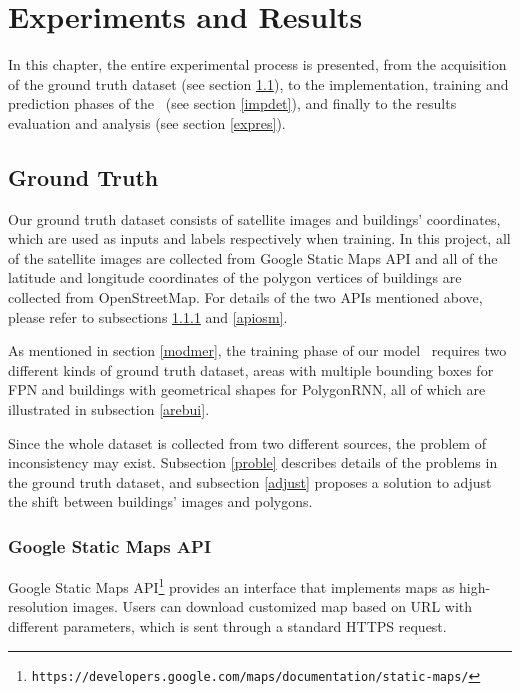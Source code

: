 \chapter{Experiments and Results}\label{exres}

In this chapter, the entire experimental process is presented, from the acquisition of the ground truth dataset (see section \ref{gt}), to the implementation, training and prediction phases of the \modelnameshort\ (see section \ref{impdet}), and finally to the results evaluation and analysis (see section \ref{expres}).

\section{Ground Truth}\label{gt}

Our ground truth dataset consists of satellite images and buildings' coordinates, which are used as inputs and labels respectively when training. In this project, all of the satellite images are collected from Google Static Maps API and all of the latitude and longitude coordinates of the polygon vertices of buildings are collected from OpenStreetMap. For details of the two APIs mentioned above, please refer to subsections \ref{apimap} and \ref{apiosm}.

As mentioned in section \ref{modmer}, the training phase of our model \modelnameshort\ requires two different kinds of ground truth dataset, areas with multiple bounding boxes for FPN and buildings with geometrical shapes for PolygonRNN, all of which are illustrated in subsection \ref{arebui}.

Since the whole dataset is collected from two different sources, the problem of inconsistency may exist. Subsection \ref{proble} describes details of the problems in the ground truth dataset, and subsection \ref{adjust} proposes a solution to adjust the shift between buildings' images and polygons.

\subsection{Google Static Maps API}\label{apimap}

Google Static Maps API\footnote{\lstinline{https://developers.google.com/maps/documentation/static-maps/}} provides an interface that implements maps as high-resolution images. Users can download customized map based on URL with different parameters, which is sent through a standard HTTPS request.


